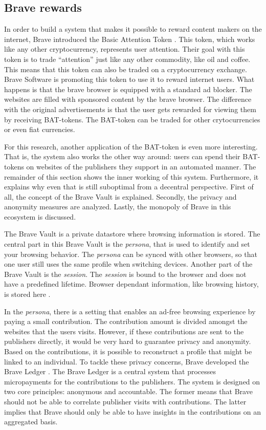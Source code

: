 \subsection{Brave rewards}
\label{sec:brave}
In order to build a system that makes it possible to reward content makers on the internet, Brave introduced the Basic Attention Token \cite{token2018blockchain}. This token, which works like any other cryptocurrency, represents user attention. Their goal with this token is to trade “attention” just like any other commodity, like oil and coffee. This means that this token can also be traded on a cryptocurrency exchange. Brave Software is promoting this token to use it to reward internet users. What happens is that the brave browser is equipped with a standard ad blocker. The websites are filled with sponsored content by the brave browser. The difference with the original advertisements is that the user gets rewarded for viewing them by receiving BAT-tokens. The BAT-token can be traded for other crytocurrencies or even fiat currencies.

For this research, another application of the BAT-token is even more interesting. That is, the system also works the other way around: users can spend their BAT-tokens on websites of the publishers they support in an automated manner. The remainder of this section shows the inner working of this system. Furthermore, it explains why even that is still suboptimal from a decentral perspective. First of all, the concept of the Brave Vault is explained. Secondly, the privacy and anonymity measures are analyzed. Lastly, the monopoly of Brave in this ecosystem is discussed.

The Brave Vault is a private datastore where browsing information is stored. The central part in this Brave Vault is the \textit{persona}, that is used to identify and set your browsing behavior. The \textit{persona} can be synced with other browsers, so that one user still uses the same profile when switching devices. Another part of the Brave Vault is the \textit{session}. The \textit{session} is bound to the browser and does not have a predefined lifetime. Browser dependant information, like browsing history, is stored here \cite{brave-vault}.

In the \textit{persona}, there is a setting that enables an ad-free browsing experience by paying a small contribution. The contribution amount is divided amongst the websites that the users visits. However, if these contributions are sent to the publishers directly, it would be very hard to guarantee privacy and anonymity. Based on the contributions, it is possible to reconstruct a profile that might be linked to an individual. To tackle these privacy concerns, Brave developed the Brave Ledger \cite{bat-ledger}. The Brave Ledger is a central system that processes micropayments for the contributions to the publishers. The system is designed on two core principles: anonymous and accountable. The former means that Brave should not be able to correlate publisher visits with contributions. The latter implies that Brave should only be able to have insights in the contributions on an aggregated basis.

